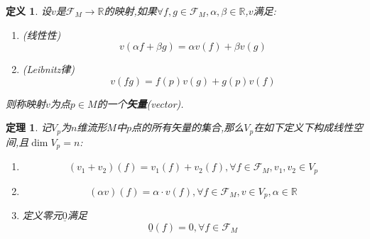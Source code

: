 \documentclass[UTF8]{article}
\begin{document}
	\newtheorem*{vectorOnManifold}{定义}
	
	\newtheorem*{vectorSpaceOnManifold}{定理}
	
	\begin{vectorOnManifold}

		设$v$是$\mathscr{F}_M \to \mathbb{R}$的映射,如果$\forall f,g \in \mathscr{F}_M, \alpha,
		\beta \in \mathbb{R}$,$v$满足:
		
		\begin{enumerate}
			
			\item (线性性) \[v(\alpha f + \beta g) = \alpha v(f) + \beta v(g)\]
			
			\item (Leibnitz律) \[v(f g) = f(p) v(g) + g(p) v(f)\]
			
		\end{enumerate}
		
		则称映射$v$为点$p \in M$的一个\textbf{矢量}(vector).
		
	\end{vectorOnManifold}
	
	\begin{vectorSpaceOnManifold}
		
		记$V_{p}$为$n$维流形$M$中$p$点的所有矢量的集合,那么$V_{p}$在如下定义下构成线性空间,且$\dim V_{p} = n$:
		
		\begin{enumerate}
			
			\item \[(v_{1} + v_{2})(f) = v_{1}(f) + v_{2}(f), \forall f \in \mathscr{F}_{M}, v_1,v_2 \in V_{p}\]
			
			\item \[(\alpha v)(f) = \alpha \cdot v(f), \forall f \in \mathscr{F}_{M}, v \in V_{p}, \alpha \in \mathbb{R}\]
			
			\item 定义零元$\underline{0}$满足
			\[\underline{0} (f) = 0, \forall f \in \mathscr{F}_{M}\]
			
		\end{enumerate}
		
	\end{vectorSpaceOnManifold}
	
\end{document}
